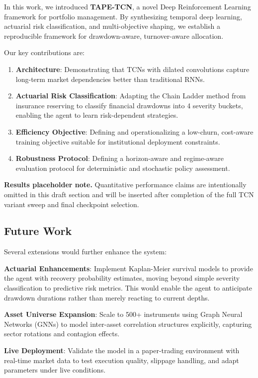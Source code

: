 In this work, we introduced \textbf{TAPE-TCN}, a novel Deep Reinforcement Learning framework for portfolio management.
By synthesizing temporal deep learning, actuarial risk classification, and multi-objective shaping, we establish a reproducible framework for drawdown-aware, turnover-aware allocation.

Our key contributions are:
\begin{enumerate}
    \item \textbf{Architecture}: Demonstrating that TCNs with dilated convolutions capture long-term market dependencies better than traditional RNNs.
    \item \textbf{Actuarial Risk Classification}: Adapting the Chain Ladder method \citep{mack1993distribution,taylor2000loss} from insurance reserving to classify financial drawdowns into 4 severity buckets, enabling the agent to learn risk-dependent strategies.
    \item \textbf{Efficiency Objective}: Defining and operationalizing a low-churn, cost-aware training objective suitable for institutional deployment constraints.
    \item \textbf{Robustness Protocol}: Defining a horizon-aware and regime-aware evaluation protocol for deterministic and stochastic policy assessment.
\end{enumerate}

\noindent\textbf{Results placeholder note.} Quantitative performance claims are intentionally omitted in this draft section and will be inserted after completion of the full TCN variant sweep and final checkpoint selection.

\subsection*{Future Work}
Several extensions would further enhance the system:

\textbf{Actuarial Enhancements}: Implement Kaplan-Meier survival models \citep{kaplan1958nonparametric} to provide the agent with recovery probability estimates, moving beyond simple severity classification to predictive risk metrics. This would enable the agent to anticipate drawdown durations rather than merely reacting to current depths.

\textbf{Asset Universe Expansion}: Scale to 500+ instruments using Graph Neural Networks (GNNs) to model inter-asset correlation structures explicitly, capturing sector rotations and contagion effects.

\textbf{Live Deployment}: Validate the model in a paper-trading environment with real-time market data to test execution quality, slippage handling, and adapt parameters under live conditions.
